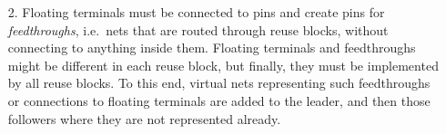 \documentclass[a2paper]{bigsposter}
\begin{document}
\begin{blockrow}
\begin{enumerate}
\item [{2.}] Floating terminals  must be connected to pins and create pins  for \textit{feedthroughs}, i.e.\
nets that are routed through reuse blocks, without connecting to anything inside them. 
Floating terminals and feedthroughs might be different in each reuse block, but finally, they must be implemented by all reuse blocks. To this end, virtual nets representing such feedthroughs
or connections to floating terminals are added to the leader, and then those followers where they are not represented already.
\end{enumerate}

\end{blockrow}
\end{document}
